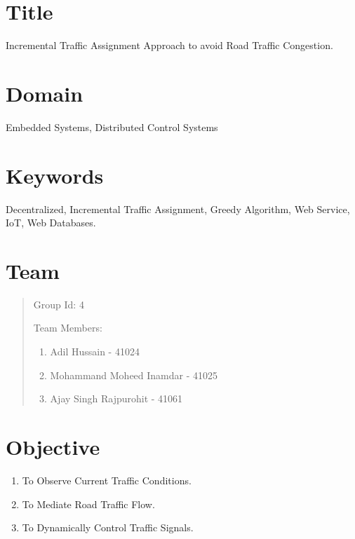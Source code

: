 \documentclass[12pt,a4paper,final]{article}
\begin{document}
\section{Title}
\setcounter{page}{1}
\begin{flushleft}
\normalsize
Incremental Traffic Assignment Approach to avoid Road Traffic Congestion.
\linebreak

\noindent
\section{Domain}
Embedded Systems, Distributed Control Systems
\linebreak

\noindent
\section{Keywords}
Decentralized, Incremental Traffic Assignment, Greedy Algorithm, Web Service, IoT, Web Databases.
\linebreak
\linebreak
\noindent
\section{Team}
\begin{quotation}
Group Id: 4 \hfill
\linebreak

Team Members:
\begin{enumerate}
\item
Adil Hussain - 41024

\item
Mohammand Moheed Inamdar - 41025

\item
Ajay Singh Rajpurohit - 41061

\end{enumerate}
\end{quotation}

\noindent
\section{Objective}
\begin{enumerate}
\item
To Observe Current Traffic Conditions.
\item
To Mediate Road Traffic Flow.
\item
To Dynamically Control Traffic Signals.
\end{enumerate}


\end{flushleft}
\end{document}
